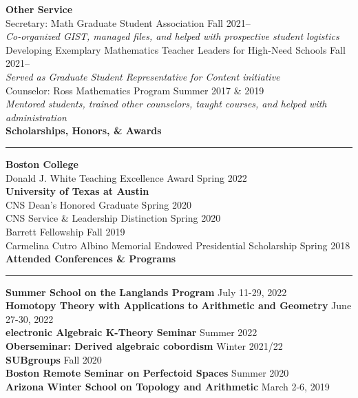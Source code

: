\documentclass[11pt]{article}
\newenvironment{mysection}{
\color{mygreen}\bfseries\large
}
{
\\ \rule{\textwidth}{1pt}\hspace{-.25em}
} %
\begin{document}
\textbf{Other Service} \\
Secretary: Math Graduate Student Association \hfill Fall 2021-- \\
\textit{Co-organized GIST, managed files, and helped with prospective student logistics} \\
Developing Exemplary Mathematics Teacher Leaders for High-Need Schools \hfill Fall 2021--\\
\textit{Served as Graduate Student Representative for Content initiative} \\
Counselor: Ross Mathematics Program \hfill Summer 2017 \& 2019 \\
\textit{Mentored students, trained other counselors, taught courses, and helped with administration} \\

\begin{mysection}Scholarships, Honors, \& Awards\end{mysection}
\textbf{Boston College} \\
Donald J. White Teaching Excellence Award \hfill Spring 2022 \\

\textbf{University of Texas at Austin} \\
CNS Dean's Honored Graduate \hfill Spring 2020 \\
CNS Service \& Leadership Distinction \hfill Spring 2020 \\
Barrett Fellowship \hfill Fall 2019 \\
Carmelina Cutro Albino Memorial Endowed Presidential Scholarship \hfill Spring 2018 \\

\begin{mysection}Attended Conferences \& Programs\end{mysection}
\textbf{Summer School on the Langlands Program} \hfill July 11-29, 2022 \\
\textbf{Homotopy Theory with Applications to Arithmetic and Geometry} \hfill June 27-30, 2022 \\
\textbf{electronic Algebraic K-Theory Seminar} \hfill Summer 2022 \\
\textbf{Oberseminar: Derived algebraic cobordism} \hfill Winter 2021/22 \\
\textbf{SUBgroups} \hfill Fall 2020 \\
\textbf{Boston Remote Seminar on Perfectoid Spaces} \hfill Summer 2020 \\
\textbf{Arizona Winter School on Topology and Arithmetic} \hfill March 2-6, 2019 \\
\end{document}
